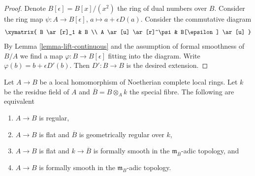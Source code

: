 \begin{proof}
Denote $B[\epsilon] = B[x]/(x^2)$ the ring of dual numbers over $B$.
Consider the ring map $\psi : A \to B[\epsilon]$,
$a \mapsto a + \epsilon D(a)$.
Consider the commutative diagram
$$
\xymatrix{
B \ar[r]_1 & B \\
A \ar[u] \ar[r]^\psi & B[\epsilon] \ar[u]
}
$$
By Lemma \ref{lemma-lift-continuous} and the assumption of formal
smoothness of $B/A$ we find a map $\varphi : B \to B[\epsilon]$ fitting into
the diagram. Write $\varphi(b) = b + \epsilon D'(b)$. Then $D' : B \to B$
is the desired extension.
\end{proof}

\begin{proposition}
\label{proposition-fs-regular}
Let $A \to B$ be a local homomorphism of Noetherian complete local rings.
Let $k$ be the residue field of $A$ and $\overline{B} = B \otimes_A k$
the special fibre.
The following are equivalent
\begin{enumerate}
\item $A \to B$ is regular,
\item $A \to B$ is flat and $\overline{B}$ is geometrically regular
over $k$,
\item $A \to B$ is flat and $k \to \overline{B}$ is formally smooth
in the $\mathfrak m_{\overline{B}}$-adic topology, and
\item $A \to B$ is formally smooth in the $\mathfrak m_B$-adic
topology.
\end{enumerate}
\end{proposition}

